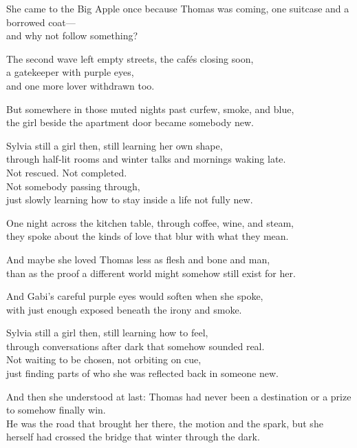 \begin{lyrics}

She came to the Big Apple once because Thomas was coming, one suitcase and a borrowed coat—\\
and why not follow something?

The second wave left empty streets, the cafés closing soon,\\
a gatekeeper with purple eyes,\\
and one more lover withdrawn too.

But somewhere in those muted nights past curfew, smoke, and blue,\\
the girl beside the apartment door became somebody new.

Sylvia still a girl then, still learning her own shape,\\
through half-lit rooms and winter talks and mornings waking late.\\
Not rescued. Not completed.\\
Not somebody passing through,\\
just slowly learning how to stay inside a life not fully new.

One night across the kitchen table, through coffee, wine, and steam,\\
they spoke about the kinds of love that blur with what they mean.

And maybe she loved Thomas less as flesh and bone and man,\\
than as the proof a different world might somehow still exist for her.

And Gabi’s careful purple eyes would soften when she spoke,\\
with just enough exposed beneath the irony and smoke.

Sylvia still a girl then, still learning how to feel,\\
through conversations after dark that somehow sounded real.\\
Not waiting to be chosen, not orbiting on cue,\\
just finding parts of who she was reflected back in someone new.

And then she understood at last: Thomas had never been a destination or a prize to somehow finally win.\\
He was the road that brought her there, the motion and the spark, but she herself had crossed the bridge that winter through the dark.


\end{lyrics}
